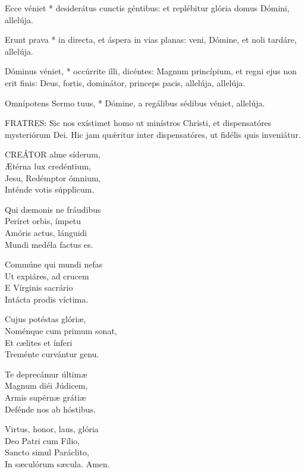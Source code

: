 
 Ecce véniet * desiderátus cunctis géntibus: et replébitur glória domus Dómini, allelúja.

 Erunt prava * in directa, et áspera in vias planas: veni, Dómine, et noli tardáre, allelúja.

 Dóminus véniet, * occúrrite illi, dicéntes: Magnum princípium, et regni ejus non erit finis: Deus, fortis, dominátor, princeps pacis, allelúja, allelúja.

 Omnípotens Sermo tuus, * Dómine, a regálibus sédibus véniet, allelúja.


\lettrine[lines=2]{F}{RATRES}: Sic nos exístimet homo ut minístros Christi, et dispensatóres mysteriórum Dei. Hic jam quǽritur inter dispensatóres, ut fidélis quis inveniátur.


\lettrine[lines=2]{C}{REÁTOR} alme síderum,\\
Ætérna lux credéntium,\\
Jesu, Redémptor ómnium,\\
Inténde votis súpplicum.

Qui dæmonis ne fráudibus\\
Períret orbis, ímpetu\\
Amóris actus, lánguidi\\
Mundi medéla factus es.

Commúne qui mundi nefas\\
Ut expiáres, ad crucem\\
E Vírginis sacrário\\
Intácta prodis víctima.

Cujus potéstas glóriæ,\\
Noménque cum primum sonat,\\
Et cælites et ínferi\\
Treménte curvántur genu.

Te deprecámur últimæ\\
Magnum diéi Júdicem,\\
Armis supérnæ grátiæ\\
Defénde nos ab hóstibus.

Virtus, honor, laus, glória\\
Deo Patri cum Fílio,\\
Sancto simul Paráclito,\\
In sæculórum sæcula. Amen.

